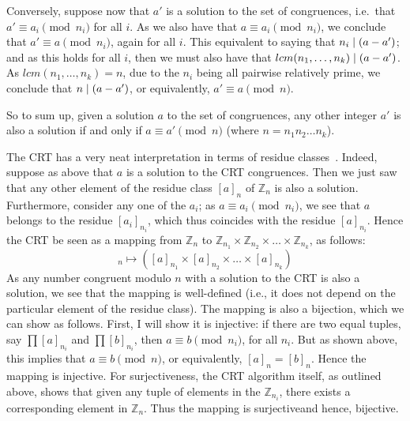   Conversely, suppose now that $a'$ is a solution to the set of congruences, i.e.\ that $a' \equiv a_i \pmod{n_i}$ for all $i$. As we also have that $a \equiv a_i \pmod{n_i}$, we conclude that $a' \equiv a \pmod{n_i}$, again for all $i$. This equivalent to saying that $n_i\mathrel{|} (a-a')$; and as this holds for all $i$, then we must also have that $lcm(n_1, \dots, n_k)\mathrel{|} (a-a')$. As $lcm(n_1, \dots, n_k) = n$, due to the $n_i$ being all pairwise relatively prime, we conclude that $n\mathrel{|} (a-a')$, or equivalently, $a' \equiv a \pmod{n}$.

  So to sum up, given a solution $a$ to the set of congruences, any other integer $a'$ is also a solution if and only if $a \equiv a' \pmod{n}$ (where $n = n_1n_2\dots n_k$).

  \medskip

  The CRT has a very neat interpretation in terms of residue classes~\cite[]{Shoup:2009}. Indeed, suppose as above that $a$ is a solution to the CRT congruences. Then we just saw that any other element of the residue class $[a]_n$ of $\mathbb{Z}_n$ is also a solution. Furthermore, consider any one of the $a_i$; as $a \equiv a_i \pmod{n_i}$, we see that $a$ belongs to the residue $[a_i]_{n_i}$, which thus coincides with the residue $[a]_{n_i}$. Hence the CRT be seen as a mapping from $\mathbb{Z}_{n}$ to $\mathbb{Z}_{n_1} \times \mathbb{Z}_{n_2} \times\dots\times \mathbb{Z}_{n_k}$, as follows:
  \begin{equation}
    [a]_n \mapsto ([a]_{n_1}\times [a]_{n_2} \times\dots\times [a]_{n_k})
  \end{equation}
  As any number congruent modulo $n$ with a solution to the CRT is also a solution, we see that the mapping is well-defined (i.e., it does not depend on the particular element of the residue class). The mapping is also a bijection, which we can show as follows. First, I will show it is injective: if there are two equal tuples, say $\prod [a]_{n_i}$ and $\prod [b]_{n_i}$, then $a \equiv b \pmod{n_i}$, for all $n_i$. But as shown above, this implies that $a \equiv b \pmod {n}$, or equivalently, $[a]_n = [b]_n$. Hence the mapping is injective. For surjectiveness, the CRT algorithm itself, as outlined above, shows that given any tuple of elements in the $\mathbb{Z}_{n_i}$, there exists a corresponding element in $\mathbb{Z}_n$. Thus the mapping is surjective\emd and hence, bijective.

